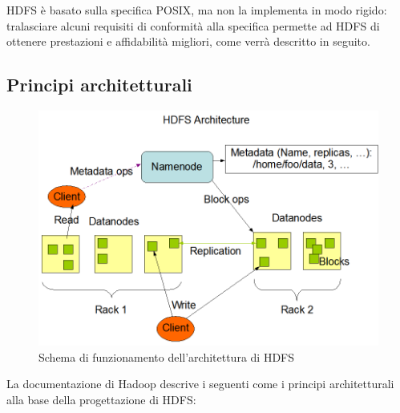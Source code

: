 \documentclass[italian,a4paper, twoside, 12pt]{report}
\begin{document}
HDFS è basato sulla specifica POSIX, ma non la implementa in modo
rigido: tralasciare alcuni requisiti di conformità alla specifica
permette ad HDFS di ottenere prestazioni e affidabilità migliori, come
verrà descritto in seguito.

\subsection{Principi architetturali}\label{principi-architetturali}

\begin{figure}
\centering
\includegraphics{img/hdfsarchitecture.png}
\caption{Schema di funzionamento dell'architettura di HDFS}
\end{figure}

La documentazione di Hadoop descrive i seguenti come i principi
architetturali alla base della progettazione di HDFS:
\end{document}
